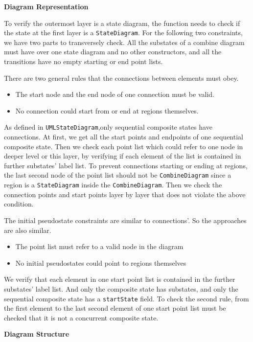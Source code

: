 \textbf{Diagram Representation}

To verify the outermost layer is a state diagram, the function needs to check if the state at the first layer is a \verb|StateDiagram|. For the following two constraints, we have two parts to transversely check. All the substates of a combine diagram must have over one state diagram and no other constructors, and all the transitions have no empty starting or end point lists.

There are two general rules that the connections between elements must obey.
\begin{itemize}
\item The start node and the end node of one connection must be valid.
\item No connection could start from or end at regions themselves.
\end{itemize}

As defined in \verb|UMLStateDiagram|,only sequential composite states have connections.
At first, we get all the start points and endpoints of one sequential composite state.
Then we check each point list which could refer to one node in deeper level or this layer, by verifying if each element of the list is contained in further substates' label list.
To prevent connections starting or ending at regions, the last second node of the point list should not be \verb|CombineDiagram| since a region is a \verb|StateDiagram| inside the \verb|CombineDiagram|.
Then we check the connection points and start points layer by layer that does not violate the above condition.

The initial pseudostate constraints are similar to connections'. So the approaches are also similar.
\begin{itemize}
\item The point list must refer to a valid node in the diagram
\item No initial pseudostates could point to regions themselves
\end{itemize}
We verify that each element in one start point list is contained in the further substates' label list.
And only the composite state has substates, and only the sequential composite state has a \verb|startState| field.
To check the second rule, from the first element to the last second element of one start point list must be checked that it is not a concurrent composite state.

\textbf{Diagram Structure}

